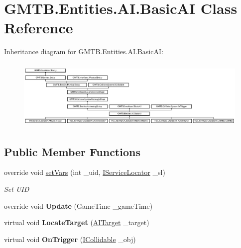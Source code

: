 \hypertarget{class_g_m_t_b_1_1_entities_1_1_a_i_1_1_basic_a_i}{}\section{G\+M\+T\+B.\+Entities.\+A\+I.\+Basic\+AI Class Reference}
\label{class_g_m_t_b_1_1_entities_1_1_a_i_1_1_basic_a_i}
Inheritance diagram for G\+M\+T\+B.\+Entities.\+A\+I.\+Basic\+AI\+:\begin{figure}[H]
\begin{center}
\leavevmode
\includegraphics[height=3.406844cm]{class_g_m_t_b_1_1_entities_1_1_a_i_1_1_basic_a_i}
\end{center}
\end{figure}
\subsection*{Public Member Functions}
\begin{DoxyCompactItemize}
\item 
override void \mbox{\hyperlink{class_g_m_t_b_1_1_entities_1_1_a_i_1_1_basic_a_i_a848c08ffa4f9f575c970308a65144f52}{set\+Vars}} (int \+\_\+uid, \mbox{\hyperlink{interface_g_m_t_b_1_1_interfaces_1_1_i_service_locator}{I\+Service\+Locator}} \+\_\+sl)
\begin{DoxyCompactList}\small\item\em Set U\+ID \end{DoxyCompactList}\item 
\mbox{\label{class_g_m_t_b_1_1_entities_1_1_a_i_1_1_basic_a_i_ab2dcbe6e9e03ab42eb40a933f4b9563b}} 
override void {\bfseries Update} (Game\+Time \+\_\+game\+Time)
\item 
\mbox{\label{class_g_m_t_b_1_1_entities_1_1_a_i_1_1_basic_a_i_a637b5df55de76f0f8d20def33d11aa50}} 
virtual void {\bfseries Locate\+Target} (\mbox{\hyperlink{interface_g_m_t_b_1_1_interfaces_1_1_a_i_target}{A\+I\+Target}} \+\_\+target)
\item 
\mbox{\label{class_g_m_t_b_1_1_entities_1_1_a_i_1_1_basic_a_i_acb77842893fbc2435bd812d7944c8f3f}} 
virtual void {\bfseries On\+Trigger} (\mbox{\hyperlink{interface_g_m_t_b_1_1_collision_system_1_1_i_collidable}{I\+Collidable}} \+\_\+obj)
\end{DoxyCompactItemize}
